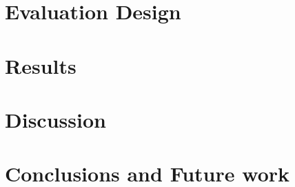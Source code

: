 \section{Evaluation Design}

\section{Results}

\section{Discussion}

\section{Conclusions and Future work}

\begin{acks}

\end{acks}